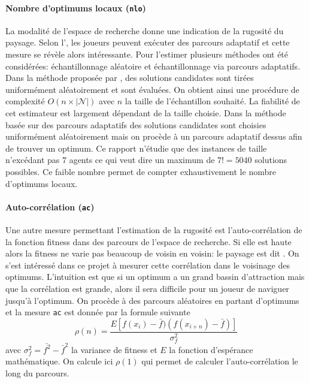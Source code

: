 \documentclass[../main.tex]{subfiles}
\begin{document}
    \paragraph{Nombre d'optimums locaux (\texttt{nlo})}{
La modalité de l'espace de recherche donne une indication de la rugosité du paysage. Selon l', les joueurs peuvent exécuter des parcours adaptatif et cette mesure se révèle alors intéressante. Pour l'estimer plusieurs méthodes ont été considérées: échantillonnage aléatoire et échantillonnage via parcours adaptatifs. Dans la méthode proposée par \cite{alyahya}, des solutions candidates sont tirées uniformément aléatoirement et sont évaluées. On obtient ainsi une procédure de complexité $O(n \times |\mathcal{N}|)$ avec $n$ la taille de l'échantillon souhaité. La fiabilité de cet estimateur est largement dépendant de la taille choisie. Dans la méthode basée sur des parcours adaptatifs des solutions candidates sont choisies uniformément aléatoirement mais on procède à un parcours adaptatif dessus afin de trouver un optimum. Ce rapport n'étudie que des instances de taille n'excédant pas $7$ agents ce qui veut dire un maximum de $7! = 5040$ solutions possibles. Ce faible nombre permet de compter exhaustivement le nombre d'optimums locaux.
    }
	
	\paragraph{Auto-corrélation (\texttt{ac})}{Une autre mesure permettant l'estimation de la rugosité est l'auto-corrélation de la fonction fitness dans des parcours de l'espace de recherche. Si elle est haute alors la fitness ne varie pas beaucoup de voisin en voisin: le paysage est dit . On s'est intéressé dans ce projet à mesurer cette corrélation dans le voisinage des optimums. L'intuition est que si un optimum a un grand bassin d'attraction mais que la corrélation est grande, alors il sera difficile pour un joueur de naviguer jusqu'à l'optimum. On procède à des parcours aléatoires en partant d'optimums et la mesure \texttt{ac} est donnée par la formule suivante \cite{pitzer}
	\begin{equation*}
    \rho(n) = \frac{E\left[f(x_i) - \bar{f})(f(x_{i+n}) - \bar{f})\right]}{
        \sigma_f^2    
    }
	\end{equation*}
	avec $\sigma_f^2 = \bar{f^2} - \bar{f}^2$ la variance de fitness et $E$ la fonction d'espérance mathématique. On calcule ici $\rho(1)$ qui permet de calculer l'auto-corrélation le long du parcours.
	}
	
\end{document}
